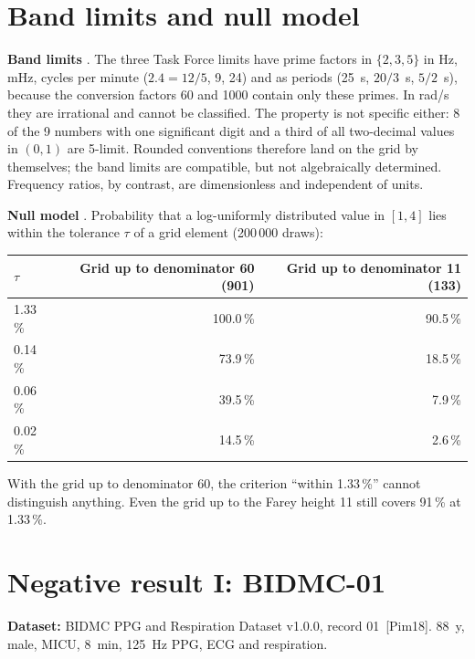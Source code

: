 \section{Band limits and null model}\label{sec:360baender}

\textbf{Band limits} \KM. The three Task Force limits have prime factors in
$\{2,3,5\}$ in Hz, mHz, cycles per minute ($2.4=12/5$, 9, 24) and as
periods (25~s, $20/3$~s, $5/2$~s), because the conversion factors 60 and
1000 contain only these primes. In rad/s they are irrational and cannot be
classified. The property is not specific either: 8 of the 9 numbers with
one significant digit and a third of all two-decimal values in $(0,1)$ are
5-limit. Rounded conventions therefore land on the grid by themselves; the
band limits are compatible, but not algebraically determined. Frequency
ratios, by contrast, are dimensionless and independent of units.

\textbf{Null model} \KM. Probability that a log-uniformly distributed
value in $[1,4]$ lies within the tolerance $\tau$ of a grid element
(200\,000 draws):

\begin{center}
\begin{tabular}{@{}lrr@{}}
\toprule
$\tau$ & Grid up to denominator 60 (901) & Grid up to denominator 11 (133) \\
\midrule
1.33\,\% & 100.0\,\% & 90.5\,\% \\
0.14\,\% & 73.9\,\% & 18.5\,\% \\
0.06\,\% & 39.5\,\% & 7.9\,\% \\
0.02\,\% & 14.5\,\% & 2.6\,\% \\
\bottomrule
\end{tabular}
\end{center}

With the grid up to denominator 60, the criterion ``within 1.33\,\%''
cannot distinguish anything. Even the grid up to the Farey height 11 still
covers 91\,\% at 1.33\,\%.

\section{Negative result I: BIDMC-01}

\textbf{Dataset:} BIDMC PPG and Respiration Dataset v1.0.0,
record 01 \LM\,[Pim18].
88~y, male, MICU, 8~min, 125~Hz PPG, ECG and respiration.

